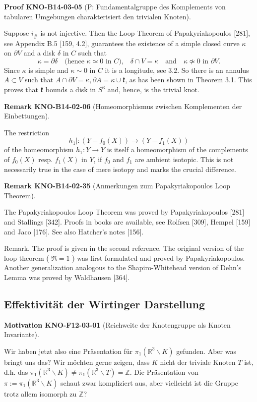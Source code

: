 \documentclass[10pt, letterpaper]{article}
\newcommand{\CustomHeading}[3]{%
  \par\medskip\noindent%
  \textbf{#1 #2} \textnormal{(#3)}.\enskip%
}
\newenvironment{REM}[2]{\CustomHeading{Remark}{#1}{#2}}{}
\newenvironment{MOT}[2]{\CustomHeading{Motivation}{#1}{#2}}{}
\newenvironment{PROOF}[2]{\CustomHeading{Proof}{#1}{#2}}{}
\begin{document}
\begin{PROOF}{KNO-B14-03-05}{P: Fundamentalgruppe des Komplements von tabularen Umgebungen charakterisiert den trivialen Knoten}
Suppose $i_{\#}$ is not injective. Then the Loop Theorem of Papakyriakopoulos [281], see Appendix B.5 [159, 4.2], guarantees the existence of a simple closed curve $\kappa$ on $\partial V$ and a disk $\delta$ in $C$ such that
$$
\kappa = \partial \delta 
\quad \text{(hence } \kappa \simeq 0 \text{ in } C\text{),} \quad 
\delta \cap V = \kappa \quad \text{and} \quad 
\kappa \not\simeq 0 \text{ in } \partial V\text{.}
$$
Since $\kappa$ is simple and $\kappa \sim 0$ in $C$ it is a longitude, see 3.2. So there is an annulus $A \subset V$ such that $A \cap \partial V=\kappa, \partial A=\kappa \cup \mathfrak{k}$, as has been shown in Theorem 3.1. This proves that $\mathfrak{k}$ bounds a disk in $S^{3}$ and, hence, is the trivial knot.
\end{PROOF}

\begin{REM}{KNO-B14-02-06}{Homeomorphismus zwischen Komplementen der Einbettungen}
The restriction
$$
h_{1} \mid:\left(Y-f_{0}(X)\right) \rightarrow\left(Y-f_{1}(X)\right)
$$
of the homeomorphism $h_{1}: Y \rightarrow Y$ is itself a homeomorphism of the complements of $f_{0}(X)$ resp. $f_{1}(X)$ in $Y$, if $f_{0}$ and $f_{1}$ are ambient isotopic. This is not necessarily true in the case of mere isotopy and marks the crucial difference.
\end{REM}

\begin{REM}{KNO-B14-02-35}{Anmerkungen zum Papakyriakopoulos Loop Theorem}
The Papakyriakopoulos Loop Theorem was proved by Papakyriakopoulos [281] and Stallings [342]. Proofs in books are available, see Rolfsen [309], Hempel [159] and Jaco [176]. See also Hatcher's notes [156].

Remark. The proof is given in the second reference. The original version of the loop theorem ( $\Re=1$ ) was first formulated and proved by Papakyriakopoulos. Another generalization analogous to the Shapiro-Whitehead version of Dehn's Lemma was proved by Waldhausen [364].
\end{REM}

\subsection{Effektivität der Wirtinger Darstellung}

\begin{MOT}{KNO-F12-03-01}{Reichweite der Knotengruppe als Knoten Invariante}
Wir haben jetzt also eine Präsentation für $\pi_1\left(\mathbb{R}^3 \backslash K\right)$ gefunden. Aber was bringt uns das? Wir möchten gerne zeigen, dass $K$ nicht der triviale Knoten $T$ ist, d.h. das $\pi_1\left(\mathbb{R}^3 \backslash K\right) \neq \pi_1\left(\mathbb{R}^3 \backslash T\right)=\mathbb{Z}$. Die Präsentation von $\pi:=\pi_1\left(\mathbb{R}^3 \backslash K\right)$ schaut zwar kompliziert aus, aber vielleicht ist die Gruppe trotz allem isomorph zu $\mathbb{Z}$?
\end{MOT}
\end{document}

